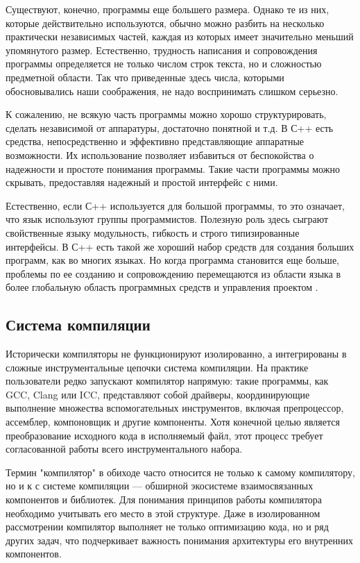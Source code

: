 Существуют, конечно, программы еще большего размера. Однако те из них, которые действительно используются, обычно можно разбить на несколько практически независимых частей, каждая из которых имеет значительно меньший упомянутого размер. Естественно, трудность написания и сопровождения программы определяется не только числом строк текста, но и сложностью предметной области. Так что приведенные здесь числа, которыми обосновывались наши соображения, не надо воспринимать слишком серьезно.

К сожалению, не всякую часть программы можно хорошо структурировать, сделать независимой от аппаратуры, достаточно понятной и т.д. В С++ есть средства, непосредственно и эффективно представляющие аппаратные возможности. Их использование позволяет избавиться от беспокойства о надежности и простоте понимания программы. Такие части программы можно скрывать, предоставляя надежный и простой интерфейс с ними.

Естественно, если С++ используется для большой программы, то это означает, что язык используют группы программистов. Полезную роль здесь сыграют свойственные языку модульность, гибкость и строго типизированные интерфейсы. В С++ есть такой же хороший набор средств для создания больших программ, как во многих языках. Но когда программа становится еще больше, проблемы по ее созданию и сопровождению перемещаются из области языка в более глобальную область программных средств и управления проектом \cite{StroustrupCpp}.


\subsection{Система компиляции}

Исторически компиляторы не функционируют изолированно, а интегрированы в сложные инструментальные цепочки система компиляции. На практике пользователи редко запускают компилятор напрямую: такие программы, как GCC, Clang или ICC, представляют собой драйверы, координирующие выполнение множества вспомогательных инструментов, включая препроцессор, ассемблер, компоновщик и другие компоненты. Хотя конечной целью является преобразование исходного кода в исполняемый файл, этот процесс требует согласованной работы всего инструментального набора.

Термин "компилятор" в обиходе часто относится не только к самому компилятору, но и к с системе компиляции — обширной экосистеме взаимосвязанных компонентов и библиотек. Для понимания принципов работы компилятора необходимо учитывать его место в этой структуре. Даже в изолированном рассмотрении компилятор выполняет не только оптимизацию кода, но и ряд других задач, что подчеркивает важность понимания архитектуры его внутренних компонентов.


